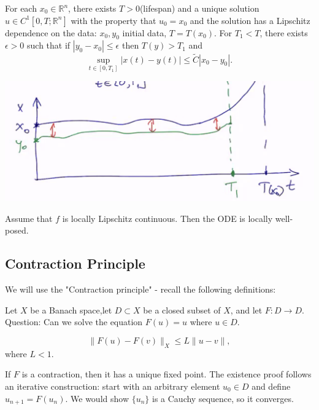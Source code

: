 \documentclass[11pt]{scrartcl}
\newcommand{\R}{\mathbb{R}}
\begin{document}
\begin{definition} For each $x_0 \in \R^n$, there exists $T > 0$(lifespan) and a unique solution $u \in C^1[0, T; \R^n]$ with the property that $u_0 = x_0$ and the solution has a Lipschitz dependence on the data: $x_0, y_0$ initial data, $T = T(x_0)$.  For $T_1 < T$, there exists $\epsilon > 0$ such that if $|y_0 - x_0| \le \epsilon$ then $T(y) > T_1$ and $$\sup_{t \in [0, T_1]} |x(t) - y(t)| \le \tilde{C}|x_0 - y_0|.$$
\end{definition}
\begin{center}
\includegraphics[scale=0.5]{localLipschitz.png}
\end{center}
\begin{thm} Assume that $f$ is locally Lipschitz continuous.  Then the ODE is locally well-posed.
\end{thm}

\subsection{Contraction Principle}
We will use the "Contraction principle" - recall the following definitions:
\begin{definition} Let $X$ be a Banach space,let $D \subset X$ be a closed subset of $X$, and let $F : D \rightarrow D$. Question: Can we solve the equation $F(u) = u$ where $u \in D$.
\end{definition}
\begin{definition}[Contraction] $$\|F(u) - F(v)\|_X \le L\|u - v\|,$$
where $L < 1$.
\end{definition}
If $F$ is a contraction, then it has a unique fixed point.  The existence proof follows an iterative construction: start with an arbitrary element $u_0 \in D$ and define $u_{n+1} = F(u_n)$.  We would show $\{u_n\}$ is a Cauchy sequence, so it converges.
\end{document}
